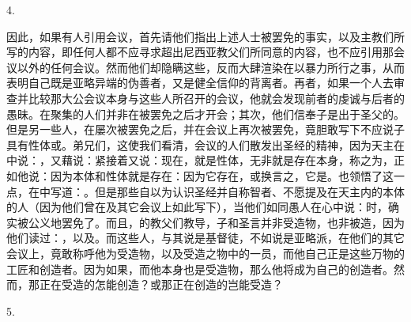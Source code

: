 4. \par

因此，如果有人引用会议，首先请他们指出上述人士被罢免的事实，以及主教们所写的内容，即任何人都不应寻求超出尼西亚教父们所同意的内容，也不应引用那会议以外的任何会议。然而他们却隐瞒这些，反而大肆渲染在以暴力所行之事，从而表明自己既是亚略异端的伪善者，又是健全信仰的背离者。再者，如果一个人去审查并比较那大公会议本身与这些人所召开的会议，他就会发现前者的虔诚与后者的愚昧。在聚集的人们并非在被罢免之后才开会；其次，他们信奉子是出于圣父的。但是另一些人，在屡次被罢免之后，并在会议上再次被罢免，竟胆敢写下不应说子具有性体或。弟兄们，这使我们看清，会议的人们散发出圣经的精神，因为天主在中说：，又藉说：紧接着又说：现在，就是性体，无非就是存在本身，称之为，正如他说：因为本体和性体就是存在：因为它存在，或换言之，它是。也领悟了这一点，在中写道：。但是那些自以为认识圣经并自称智者、不愿提及在天主内的本体的人（因为他们曾在及其它会议上如此写下），当他们如同愚人在心中说：时，确实被公义地罢免了。而且，的教父们教导，子和圣言并非受造物，也非被造，因为他们读过：，以及。而这些人，与其说是基督徒，不如说是亚略派，在他们的其它会议上，竟敢称呼他为受造物，以及受造之物中的一员，而他自己正是这些万物的工匠和创造者。因为如果，而他本身也是受造物，那么他将成为自己的创造者。然而，那正在受造的怎能创造？或那正在创造的岂能受造？\par

5. \par

